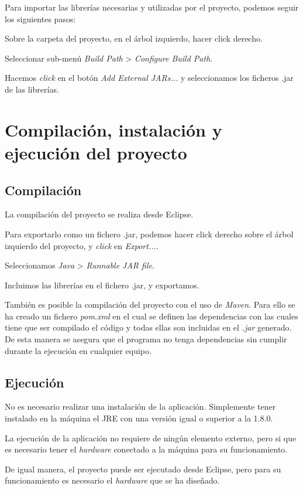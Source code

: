 Para importar las librerías necesarias y utilizadas por el proyecto, podemos seguir los siguientes pasos:

Sobre la carpeta del proyecto, en el árbol izquierdo, hacer click derecho.

Seleccionar sub-menú \emph{Build Path} > \emph{Configure Build Path}.

Hacemos \emph{click} en el botón \emph{Add External JARs...} y seleccionamos los ficheros .jar de las librerías.


\section{Compilación, instalación y ejecución del proyecto}


\subsection{Compilación}
La compilación del proyecto se realiza desde Eclipse. 

Para exportarlo como un fichero .jar, podemos hacer click derecho sobre el árbol izquierdo del proyecto, y \emph{click} en \emph{Export...}.

Seleccionamos \emph{Java} > \emph{Runnable JAR file}.

Incluimos las librerías en el fichero .jar, y exportamos.

También es posible la compilación del proyecto con el uso de \emph{Maven}.
Para ello se ha creado un fichero \textit{pom.xml} en el cual se definen las dependencias con las cuales tiene que ser compilado el código y todas ellas son incluidas en el \textit{.jar} generado. De esta manera se asegura que el programa no tenga dependencias sin cumplir durante la ejecución en cualquier equipo.

\subsection{Ejecución}

No es necesario realizar una instalación de la aplicación. Simplemente tener instalado en la máquina el JRE con una versión igual o superior a la 1.8.0.

La ejecución de la aplicación no requiere de ningún elemento externo, pero si que es necesario tener el \emph{hardware} conectado a la máquina para su funcionamiento.

De igual manera, el proyecto puede ser ejecutado desde Eclipse, pero para su funcionamiento es necesario el \emph{hardware} que se ha diseñado.

